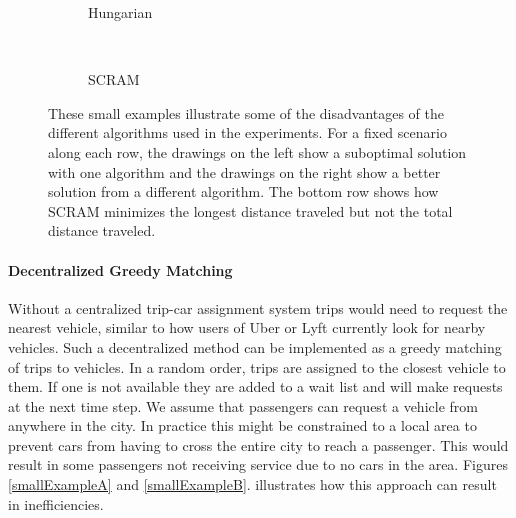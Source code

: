 \documentclass[letterpaper]{article}
\begin{document}
\begin{figure}
\begin{subfigure}[t]{0.2\textwidth}
\caption{Hungarian}
\label{smallExampleE}
\end{subfigure}
~
\begin{subfigure}[t]{0.2\textwidth}
\caption{SCRAM}
\label{smallExampleF}
\end{subfigure}

\caption{These small examples illustrate some of the disadvantages of the different algorithms used in the experiments. For a fixed scenario along each row, the drawings on the left show a suboptimal solution with one algorithm and the drawings on the right show a better solution from a different algorithm. The bottom row shows how SCRAM minimizes the longest distance traveled but not the total distance traveled.} 
\label{smallExampleFigure}
\end{figure}

\paragraph{Decentralized Greedy Matching}
Without a centralized trip-car assignment system trips would need to request the nearest vehicle, similar to how users of Uber or Lyft currently look for nearby vehicles. Such a decentralized method can be implemented as a greedy matching of trips to vehicles. In a random order, trips are assigned to the closest vehicle to them. If one is not available they are added to a wait list and will make requests at the next time step. We assume that passengers can request a vehicle from anywhere in the city. In practice this might be constrained to a local area to prevent cars from having to cross the entire city to reach a passenger. This would result in some passengers not receiving service due to no cars in the area. Figures \ref{smallExampleA} and \ref{smallExampleB}. illustrates how this approach can result in inefficiencies.
\end{document}
